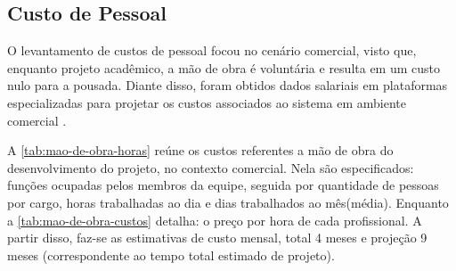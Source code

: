 \documentclass[
	12pt,				%
	openany,			%
	oneside,			%
	a4paper,			%
	english,			%
	french,				%
	spanish,			%
	brazil				%
	]{abntex2}
\begin{document}

\subsection{Custo de Pessoal}
O levantamento de custos de pessoal focou no cenário comercial, visto que, enquanto projeto acadêmico, a mão de obra é voluntária e resulta em um custo nulo para a pousada. Diante disso, foram obtidos dados salariais em plataformas especializadas para projetar os custos associados ao sistema em  ambiente comercial \cite{glassdoor2025, indeed2025}. 

A \autoref{tab:mao-de-obra-horas} reúne os custos referentes a mão de obra do desenvolvimento do projeto, no contexto comercial. 
Nela são especificados: funções ocupadas pelos membros da equipe, seguida por quantidade de pessoas por cargo, horas trabalhadas ao dia e dias trabalhados ao mês(média). Enquanto a \autoref{tab:mao-de-obra-custos} detalha: o preço por hora de cada profissional. A partir disso, faz-se as estimativas de custo mensal, total 4 meses e projeção 9 meses (correspondente ao tempo total estimado de projeto).
\end{document}
